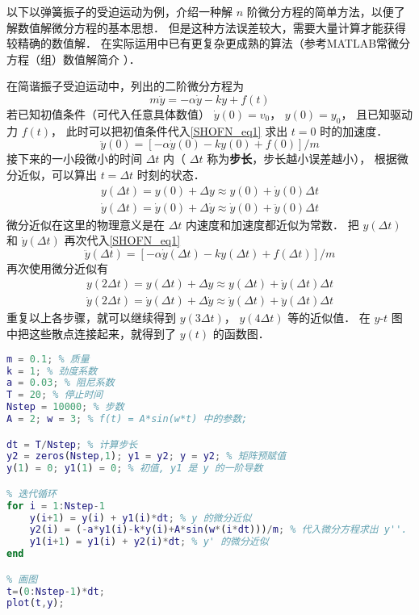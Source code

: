 

以下以弹簧振子的受迫运动为例，介绍一种解 $n$ 阶微分方程的简单方法，以便了解数值解微分方程的基本思想． 但是这种方法误差较大，需要大量计算才能获得较精确的数值解． 在实际运用中已有更复杂更成熟的算法（参考MATLAB常微分方程（组）数值解简介%
）．

在简谐振子受迫运动中，列出的二阶微分方程为
\begin{equation}\label{SHOFN_eq1}
m\ddot y = -\alpha \dot y - ky + f(t)
\end{equation}
若已知初值条件（可代入任意具体数值） $\dot y(0) = v_0$，  $y(0) = y_0$， 且已知驱动力 $f(t)$， 此时可以把初值条件代入\autoref{SHOFN_eq1} 求出 $t = 0$ 时的加速度．
\begin{equation}
\ddot y(0) = [- \alpha \dot y(0) - ky(0) + f(0)]/m
\end{equation}
接下来的一小段微小的时间 $\Delta t$ 内（ $\Delta t$ 称为\textbf{步长}，步长越小误差越小）， 根据微分近似，可以算出 $t = \Delta t$ 时刻的状态．
\begin{gather}
y(\Delta t) =  y(0) + \Delta y \approx y(0) + \dot y(0) \Delta t\\
\dot y(\Delta t) = \dot y(0) + \Delta \dot y \approx \dot y(0) + \ddot y(0) \Delta t
\end{gather}
微分近似在这里的物理意义是在 $\Delta t$ 内速度和加速度都近似为常数． 把 $y(\Delta t)$ 和 $\dot y(\Delta t)$ 再次代入\autoref{SHOFN_eq1}
\begin{equation}
\ddot y(\Delta t) = [- \alpha \dot y(\Delta t) - ky(\Delta t) + f(\Delta t)]/m
\end{equation}
再次使用微分近似有
\begin{gather}
y(2\Delta t) =  y(\Delta t) + \Delta y \approx y(\Delta t) + \dot y(\Delta t) \Delta t\\
\dot y(2\Delta t) = \dot y(\Delta t) + \Delta \dot y \approx \dot y(\Delta t) + \ddot y(\Delta t) \Delta t
\end{gather}
重复以上各步骤，就可以继续得到 $y(3\Delta t)$，  $y(4\Delta t)$ 等的近似值． 在 $y$-$t$ 图中把这些散点连接起来，就得到了 $y(t)$ 的函数图．

\begin{lstlisting}[language=matlab, caption=SHOf.m]
% 参数设定
m = 0.1; % 质量
k = 1; % 劲度系数
a = 0.03; % 阻尼系数
T = 20; % 停止时间
Nstep = 10000; % 步数
A = 2; w = 3; % f(t) = A*sin(w*t) 中的参数;

dt = T/Nstep; % 计算步长
y2 = zeros(Nstep,1); y1 = y2; y = y2; % 矩阵预赋值
y(1) = 0; y1(1) = 0; % 初值, y1 是 y 的一阶导数

% 迭代循环
for i = 1:Nstep-1
    y(i+1) = y(i) + y1(i)*dt; % y 的微分近似
    y2(i) = (-a*y1(i)-k*y(i)+A*sin(w*(i*dt)))/m; % 代入微分方程求出 y''.
    y1(i+1) = y1(i) + y2(i)*dt; % y' 的微分近似
end

% 画图
t=(0:Nstep-1)*dt;
plot(t,y);
\end{lstlisting}

